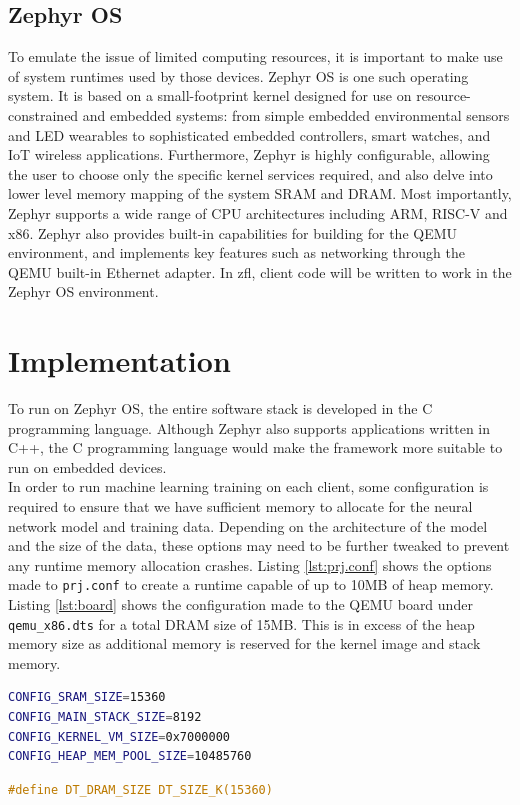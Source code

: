 \documentclass[12pt]{article}
\begin{document}
\subsection{Zephyr OS}
To emulate the issue of limited computing resources, it is important to make use of system runtimes
used by those devices. Zephyr OS\cite{zephyr} is one such operating system. It is based on a small-footprint kernel designed for use on resource-constrained
and embedded systems: from simple embedded environmental sensors and LED wearables to sophisticated embedded controllers, smart watches, and IoT wireless applications.
Furthermore, Zephyr is highly configurable, allowing the user to choose only the specific kernel
services required, and also delve into lower level memory mapping of the system SRAM and DRAM. Most
importantly, Zephyr supports a wide range of CPU architectures including ARM, RISC-V and x86.
Zephyr also provides built-in capabilities for building for the QEMU environment, and implements key
features such as networking through the QEMU built-in Ethernet adapter. In zfl,
client code will be written to work in the Zephyr OS environment.

\section{Implementation}\label{implementation}
To run on Zephyr OS, the entire software stack is developed in the C programming language. Although
Zephyr also supports applications written in C++, the C programming language would make the framework
more suitable to run on embedded devices. \\

In order to run machine learning training on each client, some configuration is required to ensure
that we have sufficient memory to allocate for the neural network model and training data. Depending
on the architecture of the model and the size of the data, these options may need to be further tweaked to
prevent any runtime memory allocation crashes. Listing \ref{lst:prj.conf} shows the options made to
\verb|prj.conf| to create a runtime capable of up to 10MB of heap memory. Listing
\ref{lst:board} shows
the configuration made to the QEMU board under \verb|qemu_x86.dts| for a total DRAM size of 15MB.
This is in excess of the heap memory size as additional memory is reserved for the kernel image and
stack memory.

\begin{minipage}{.45\textwidth}
\begin{lstlisting}[language=bash,caption={Zephyr prj.conf},label={lst:prj.conf}]
CONFIG_SRAM_SIZE=15360
CONFIG_MAIN_STACK_SIZE=8192
CONFIG_KERNEL_VM_SIZE=0x7000000
CONFIG_HEAP_MEM_POOL_SIZE=10485760
\end{lstlisting}
\end{minipage}\hfill
\begin{minipage}{.45\textwidth}
\begin{lstlisting}[language=C,caption={QEMU board.dts},label={lst:board}]
#define DT_DRAM_SIZE DT_SIZE_K(15360)
\end{lstlisting}
\end{minipage}
\end{document}
